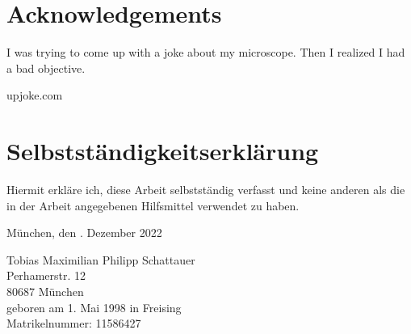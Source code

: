 \chapter*{Acknowledgements}
\epigraph{I was trying to come up with a joke about my microscope. Then I realized I had a bad objective.}{upjoke.com}



\chapter*{Selbstständigkeitserklärung}
Hiermit erkläre ich, diese Arbeit selbstständig verfasst und keine anderen als die in der Arbeit angegebenen Hilfsmittel verwendet zu haben.

\vspace{5cm}
München, den . Dezember 2022

\vspace{3cm}
Tobias Maximilian Philipp Schattauer \\
\ifprintversion
Perhamerstr. 12 \\
80687 München \\
geboren am 1. Mai 1998 in Freising \\
Matrikelnummer: 11586427
\fi